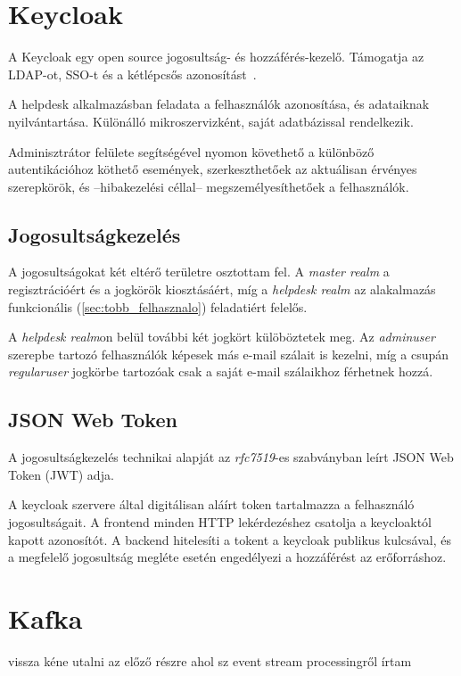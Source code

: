 \section{Keycloak}
A Keycloak egy open source jogosultság- és hozzáférés-kezelő. Támogatja az LDAP-ot, SSO-t és a kétlépcsős azonosítást~\cite{Keycloak_website}. 

A helpdesk alkalmazásban feladata a felhasználók azonosítása, és adataiknak nyilvántartása. Különálló mikroszervizként, saját adatbázissal rendelkezik.

Adminisztrátor felülete segítségével nyomon követhető a különböző autentikációhoz köthető események, szerkeszthetőek az aktuálisan érvényes szerepkörök, és --hibakezelési céllal-- megszemélyesíthetőek a felhasználók.


\subsection{Jogosultságkezelés}
A jogosultságokat két eltérő területre osztottam fel. A \textit{master realm} a regisztrációért és a jogkörök kiosztásáért, míg a \textit{helpdesk realm} az alakalmazás funkcionális (\ref{sec:tobb_felhasznalo}) feladatiért felelős.

A \textit{helpdesk realm}on belül további két jogkört külöböztetek meg. Az \textit{admin\textunderscore user} szerepbe tartozó felhasználók képesek más e-mail szálait is kezelni, míg a csupán \textit{regular\textunderscore user} jogkörbe tartozóak csak a saját e-mail szálaikhoz férhetnek hozzá.


\subsection{JSON Web Token}
A jogosultságkezelés technikai alapját az \textit{rfc7519}-es szabványban \cite{rfc7519_JSON_Web_Token} leírt JSON Web Token (JWT) adja. 

A keycloak szervere által digitálisan aláírt token tartalmazza a felhasználó jogosultságait. A frontend minden HTTP lekérdezéshez csatolja a keycloaktól kapott azonosítót. A backend hitelesíti a tokent a keycloak publikus kulcsával, és a megfelelő jogosultság megléte esetén engedélyezi a hozzáférést az erőforráshoz.


\section{Kafka}
vissza kéne utalni az előző részre ahol sz event stream processingről írtam